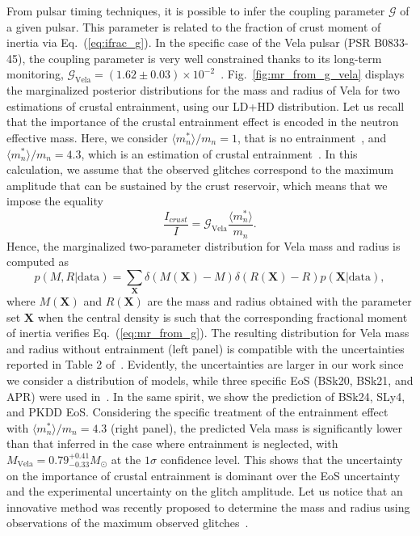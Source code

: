 From pulsar timing techniques, it is possible to infer the coupling parameter 
$\mathcal{G}$ of a given pulsar. This parameter is related to the fraction
of crust moment of inertia via Eq.~(\ref{eq:ifrac_g}). In the specific case of 
the Vela pulsar (PSR B0833-45), the coupling parameter is very well 
constrained thanks to its long-term monitoring, 
$\mathcal{G}_{\text{Vela}}=(1.62\pm 0.03)\times 10^{-2}$~\cite{Ho2015}.
Fig.~\ref{fig:mr_from_g_vela} displays the marginalized posterior distributions
for the mass and radius of Vela for two estimations of crustal entrainment,
using our LD+HD distribution.
Let us recall that the importance of the crustal entrainment effect is encoded 
in the neutron effective mass. Here, we consider $\langle m_n^* \rangle/m_n 
= 1$, that is no entrainment~\cite{Link1999}, and 
$\langle m_n^*\rangle/m_n = 4.3$, which is an estimation of crustal
entrainment~\cite{Andersson2012}. 
In this calculation, we assume that the observed glitches correspond to the 
maximum amplitude that can be sustained by the crust reservoir, which means 
that we impose the equality
%
\begin{equation}
  \frac{I_{crust}}{I} = \mathcal{G}_{\text{Vela}}\frac{\langle
  m_n^*\rangle}{m_n}.\label{eq:mr_from_g}
\end{equation}
%
Hence, the marginalized two-parameter distribution for Vela mass and radius is 
computed as
%
\begin{equation}
  p(M,R|\text{data})=
  \sum_{\bm{X}}\delta(M(\bm{X})-M)\delta(R(\bm{X})-R)
  p(\bm{X}|\text{data}),
\end{equation}
%
where $M(\bm{X})$ and $R(\bm{X})$ are the mass and radius obtained with the
parameter set $\bm{X}$ when the central density is such that the corresponding
fractional moment of inertia verifies Eq.~(\ref{eq:mr_from_g}). 
The resulting distribution for Vela mass and radius without entrainment (left
panel) is compatible with the uncertainties reported in Table 2 
of~\cite{Ho2015}. Evidently, the uncertainties are larger in our work since we 
consider a distribution of models, while three specific EoS (BSk20, BSk21, and 
APR) were used in~\cite{Ho2015}. In the same spirit, we show the prediction of 
BSk24, SLy4, and PKDD EoS. Considering the specific treatment of the
entrainment effect with $\langle m_n^*\rangle/m_n = 4.3$ (right panel), the 
predicted Vela mass is significantly lower than that inferred in the case where
entrainment is neglected, with $M_{\text{Vela}}=0.79_{-0.33}^{+0.41} M_\odot$ 
at the $1\sigma$ confidence level. This shows that the uncertainty on the
importance of crustal entrainment is dominant over the EoS uncertainty and the
experimental uncertainty on the glitch amplitude.
Let us notice that an innovative method was recently proposed to determine the 
mass and radius using observations of the maximum observed
glitches~\cite{Pizzochero2017}.

